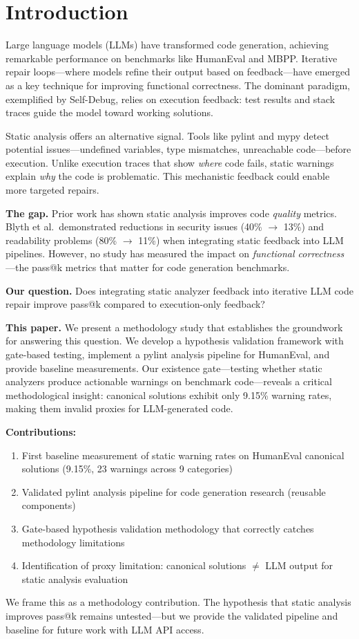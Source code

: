 \section{Introduction}

Large language models (LLMs) have transformed code generation, achieving remarkable performance on benchmarks like HumanEval and MBPP. Iterative repair loops---where models refine their output based on feedback---have emerged as a key technique for improving functional correctness. The dominant paradigm, exemplified by Self-Debug, relies on execution feedback: test results and stack traces guide the model toward working solutions.

Static analysis offers an alternative signal. Tools like pylint and mypy detect potential issues---undefined variables, type mismatches, unreachable code---before execution. Unlike execution traces that show \emph{where} code fails, static warnings explain \emph{why} the code is problematic. This mechanistic feedback could enable more targeted repairs.

\textbf{The gap.} Prior work has shown static analysis improves code \emph{quality} metrics. Blyth et al.\ demonstrated reductions in security issues (40\% $\rightarrow$ 13\%) and readability problems (80\% $\rightarrow$ 11\%) when integrating static feedback into LLM pipelines. However, no study has measured the impact on \emph{functional correctness}---the pass@k metrics that matter for code generation benchmarks.

\textbf{Our question.} Does integrating static analyzer feedback into iterative LLM code repair improve pass@k compared to execution-only feedback?

\textbf{This paper.} We present a methodology study that establishes the groundwork for answering this question. We develop a hypothesis validation framework with gate-based testing, implement a pylint analysis pipeline for HumanEval, and provide baseline measurements. Our existence gate---testing whether static analyzers produce actionable warnings on benchmark code---reveals a critical methodological insight: canonical solutions exhibit only 9.15\% warning rates, making them invalid proxies for LLM-generated code.

\textbf{Contributions:}
\begin{enumerate}
    \item First baseline measurement of static warning rates on HumanEval canonical solutions (9.15\%, 23 warnings across 9 categories)
    \item Validated pylint analysis pipeline for code generation research (reusable components)
    \item Gate-based hypothesis validation methodology that correctly catches methodology limitations
    \item Identification of proxy limitation: canonical solutions $\neq$ LLM output for static analysis evaluation
\end{enumerate}

We frame this as a methodology contribution. The hypothesis that static analysis improves pass@k remains untested---but we provide the validated pipeline and baseline for future work with LLM API access.
